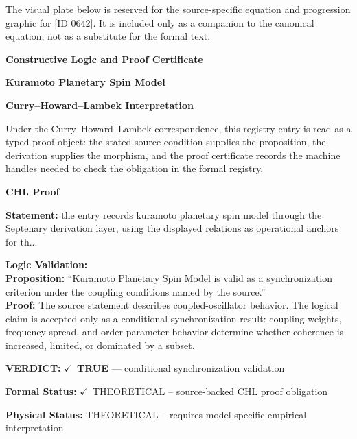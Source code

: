 \begingroup\footnotesize\sloppy
The visual plate below is reserved for the source-specific equation and progression graphic for [ID 0642]. It is included only as a companion to the canonical equation, not as a substitute for the formal text.
\par\endgroup
\ifTZPDarkEdition
{}
\fi

\clearpage
\begingroup\tzpsupportsetup
\noindent\textbf{\fontsize{10.8pt}{12.8pt}\selectfont [ID 0642] Constructive Logic and Proof Certificate}\par
\noindent\textbf{\fontsize{10pt}{12pt}\selectfont Kuramoto Planetary Spin Model}\par
\vspace{0.45em}
\begingroup
\footnotesize
\setlength{\parskip}{0.22em}
\setlength{\parindent}{0pt}
\noindent\textbf{Curry--Howard--Lambek Interpretation}\par
Under the Curry--Howard--Lambek correspondence, this registry entry is read as a typed proof
object: the stated source condition supplies the proposition, the derivation supplies the
morphism, and the proof certificate records the machine handles needed to check the obligation
in the formal registry.

\vspace{0.45em}
\noindent\textbf{CHL Proof}\par
\textbf{Statement:} the entry records kuramoto planetary spin model through the Septenary derivation layer,
using the displayed relations as operational anchors for th...

\textbf{Logic Validation:}\\
\textbf{Proposition:} ``Kuramoto Planetary Spin Model is valid as a synchronization criterion under the coupling
conditions named by the source.''\\
\textbf{Proof:} The source statement describes coupled-oscillator behavior. The logical claim is
accepted only as a conditional synchronization result: coupling weights, frequency
spread, and order-parameter behavior determine whether coherence is increased, limited,
or dominated by a subset.

\textbf{VERDICT:} \ensuremath{\checkmark}\ \textbf{TRUE} --- conditional synchronization validation

\textbf{Formal Status:} \ensuremath{\checkmark}\ THEORETICAL -- source-backed CHL proof obligation

\textbf{Physical Status:} THEORETICAL -- requires model-specific empirical interpretation
\par\vspace{0.45em}
\par
\ifTZPDarkEdition
{}
\fi
\endgroup
\endgroup
